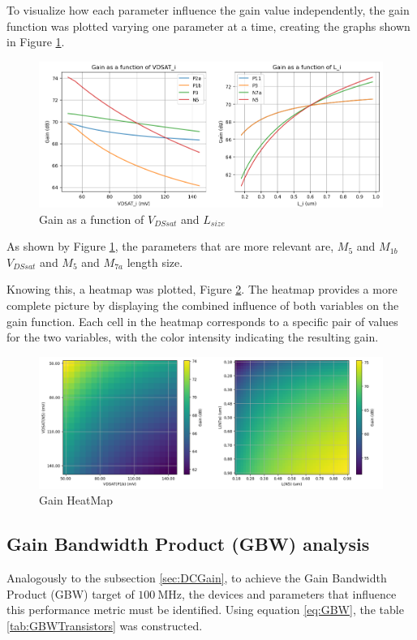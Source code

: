 To visualize how each parameter influence the gain value independently, the gain function was plotted varying one parameter at a time, creating the graphs shown in Figure \ref{fig:GainVariation}. 

\begin{figure}[H]
    \centering
    \includegraphics[width=1\textwidth]{Images/GainVariation.png}
    \caption{Gain as a function of $V_{DSsat}$ and $L_{size}$}
    \label{fig:GainVariation}
\end{figure}

As shown by Figure \ref{fig:GainVariation}, the parameters that are more relevant are, $M_{5}$ and $M_{1b}$ $V_{DSsat}$ and $M_{5}$ and $M_{7a}$ length size.

Knowing this, a heatmap was plotted, Figure \ref{fig:GainHeatMap}. The heatmap provides a more complete picture by displaying the combined influence of both variables on the gain function. Each cell in the heatmap corresponds to a specific pair of values for the two variables, with the color intensity indicating the resulting gain.

\begin{figure}[H]
    \centering
    \includegraphics[width=1\textwidth]{Images/GainHeatMap.png}
    \caption{Gain HeatMap}
    \label{fig:GainHeatMap}
\end{figure}


\subsection{Gain Bandwidth Product (GBW) analysis}
\label{sec:GBWPython}
Analogously to the subsection \ref{sec:DCGain}, to achieve the Gain Bandwidth Product (GBW) target of $\SI{100}{\mega\hertz}$, the devices and parameters that influence this performance metric must be identified. Using equation \ref{eq:GBW}, the table \ref{tab:GBWTransistors} was constructed.

